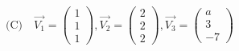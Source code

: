 \documentclass{article}
\begin{document}
\[ \text{(C)} \quad \vec{V_1} = \begin{pmatrix} 1 \\ 1 \\ 1 \end{pmatrix}, \vec{V_2} = \begin{pmatrix} 2 \\ 2 \\ 2 \end{pmatrix}, \vec{V_3} = \begin{pmatrix} a \\ 3 \\ -7 \end{pmatrix} \]
\end{document}
